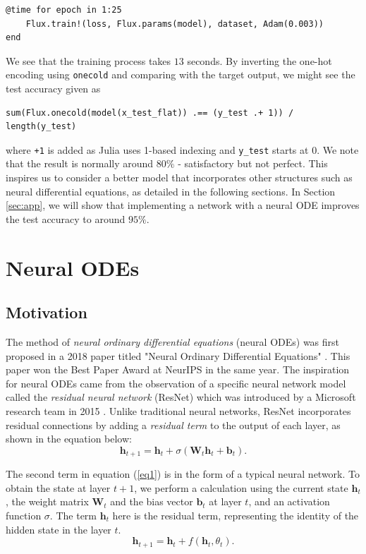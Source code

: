 \documentclass[a4paper,11pt,titlepage]{article}
\theoremstyle{definition}
\theoremstyle{plain}
\theoremstyle{remark}
\begin{document}
\begin{verbatim}
@time for epoch in 1:25
    Flux.train!(loss, Flux.params(model), dataset, Adam(0.003))
end
\end{verbatim}

We see that the training process takes $13$ seconds. By inverting the one-hot encoding using \verb|onecold| and comparing with the target output, we might see the test accuracy given as 

\begin{verbatim}
sum(Flux.onecold(model(x_test_flat)) .== (y_test .+ 1)) / length(y_test)
\end{verbatim}

where \verb|+1| is added as Julia uses 1-based indexing and \verb|y_test| starts at 0. We note that the result is normally around $80\%$ - satisfactory but not perfect. This inspires us to consider a better model that incorporates other structures such as neural differential equations, as detailed in the following sections. In Section \ref{sec:app}, we will show that implementing a network with a neural ODE improves the test accuracy to around $95\%$.

\pagebreak
\section{Neural ODEs}
\label{sec:intro}

\subsection{Motivation}

The method of \textit{neural ordinary differential equations} (neural ODEs) was first proposed in a 2018 paper titled "Neural Ordinary Differential Equations" \cite{chen2018neural}. This paper won the Best Paper Award at NeurIPS in the same year. The inspiration for neural ODEs came from the observation of a specific neural network model called the \textit{residual neural network} (ResNet) which was introduced by a Microsoft research team in 2015 \cite{he2016deep}. Unlike traditional neural networks, ResNet incorporates residual connections by adding a \textit{residual term} to the output of each layer, as shown in the equation below:
\begin{equation}\label{eq1}
    \textbf{h}_{t+1} = \textbf{h}_t + \sigma\left(\textbf{W}_t\textbf{h}_t + \textbf{b}_t\right).
\end{equation}

The second term in equation (\ref{eq1}) is in the form of a typical neural network. To obtain the state at layer $t+1$, we perform a calculation using the current state $\textbf{h}_t$, the weight matrix $\textbf{W}_t$ and the bias vector $\textbf{b}_t$ at layer $t$, and an activation function $\sigma$. The term $\textbf{h}_t$ here is the residual term, representing the identity of the hidden state in the layer $t$.
\begin{equation}\label{eq2}
    \textbf{h}_{t+1} = \textbf{h}_t + f\left(\textbf{h}_t, \theta_t\right).
\end{equation}
\end{document}
